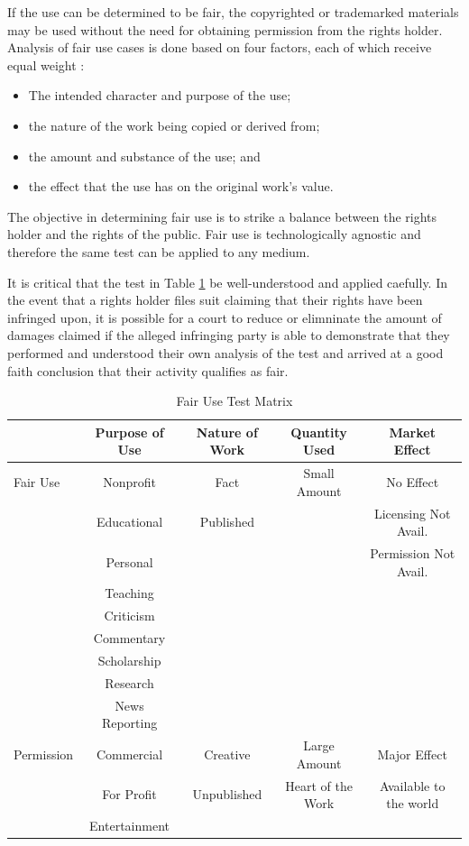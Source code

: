 \documentclass[letterpaper,11pt]{texMemo}
\begin{document}
  If the use can be determined to be fair, the copyrighted or trademarked materials may be used without the need for obtaining permission from the rights holder. Analysis of fair use cases is done based on four factors, each of which receive equal weight \cite{saracino}:
    \begin{itemize}
      \item The intended character and purpose of the use;
      \item the nature of the work being copied or derived from;
      \item the amount and substance of the use; and
      \item the effect that the use has on the original work's value.
    \end{itemize}
  The objective in determining fair use is to strike a balance between the rights holder and the rights of the public. Fair use is technologically agnostic and therefore the same test can be applied to any medium.

  It is critical that the test in Table \ref{tab:fair-use-test} be well-understood and applied caefully. In the event that a rights holder files suit claiming that their rights have been infringed upon, it is possible for a court to reduce or elimninate the amount of damages claimed if the alleged infringing party is able to demonstrate that they performed and understood their own analysis of the test and arrived at a good faith conclusion that their activity qualifies as fair.

  \begin{table}
  \centering
  \caption{Fair Use Test Matrix \cite{purdue}}
  \vspace{2ex}
  \begin{tabularx}{\linewidth}{|X|c|c|c|c|} \hline
   & Purpose of Use & Nature of Work & Quantity Used & Market Effect\\ \hline\hline
   Fair Use & Nonprofit & Fact & Small Amount & No Effect \\
   & Educational & Published & & Licensing Not Avail. \\
   & Personal & & & Permission Not Avail. \\
   & Teaching & & & \\
   & Criticism & & & \\
   & Commentary & & & \\
   & Scholarship & & & \\
   & Research & & & \\
   & News Reporting & & & \\ \hline \hline
  Permission & Commercial & Creative & Large Amount & Major Effect \\
    & For Profit & Unpublished & Heart of the Work & Available to the world \\
    & Entertainment & & & \\ \hline
\end{tabularx}
  \label{tab:fair-use-test}
  \end{table}
\end{document}
